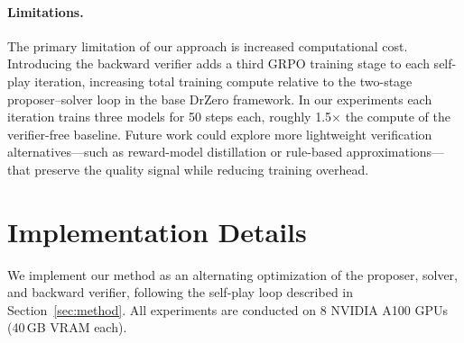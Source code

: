\documentclass{article}
\begin{document}
\paragraph{Limitations.}
The primary limitation of our approach is increased computational cost.
Introducing the backward verifier adds a third GRPO training stage to each self-play iteration, increasing total training compute relative to the two-stage proposer--solver loop in the base DrZero framework.
In our experiments each iteration trains three models for 50 steps each, roughly 1.5$\times$ the compute of the verifier-free baseline.
Future work could explore more lightweight verification alternatives---such as reward-model distillation or rule-based approximations---that preserve the quality signal while reducing training overhead.










\newpage
\appendix

\section{Implementation Details}
\label{app:implementation}

We implement our method as an alternating optimization of the proposer, solver, and backward verifier, following the self-play loop described in Section~\ref{sec:method}.
All experiments are conducted on 8 NVIDIA A100 GPUs (40\,GB VRAM each).
\end{document}
